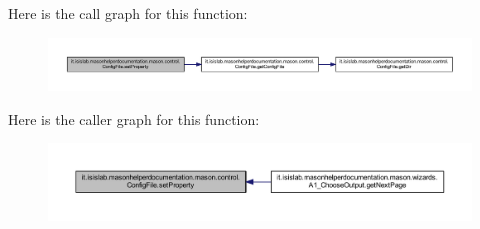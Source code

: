 Here is the call graph for this function\-:
\nopagebreak
\begin{figure}[H]
\begin{center}
\leavevmode
\includegraphics[width=350pt]{classit_1_1isislab_1_1masonhelperdocumentation_1_1mason_1_1control_1_1_config_file_a29d4bd9c148d1d7576cef7bcaf796172_cgraph}
\end{center}
\end{figure}




Here is the caller graph for this function\-:
\nopagebreak
\begin{figure}[H]
\begin{center}
\leavevmode
\includegraphics[width=350pt]{classit_1_1isislab_1_1masonhelperdocumentation_1_1mason_1_1control_1_1_config_file_a29d4bd9c148d1d7576cef7bcaf796172_icgraph}
\end{center}
\end{figure}




